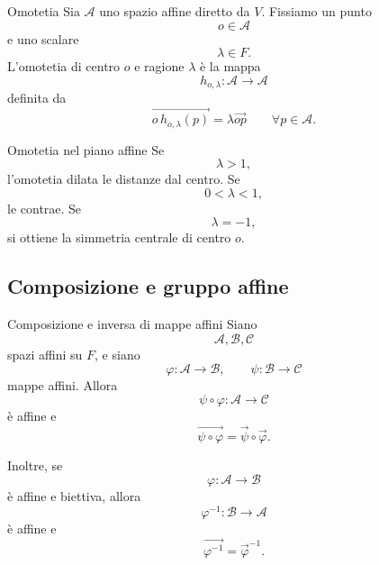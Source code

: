 \documentclass[a4paper]{article}
\begin{document}
\begin{snippetdefinition}{Omotetia}
    Sia \(\mathcal{A}\) uno spazio affine diretto da \(V\). Fissiamo un punto
    \[
        o\in\mathcal{A}
    \]
    e uno scalare
    \[
        \lambda\in F.
    \]
    L'omotetia di centro \(o\) e ragione \(\lambda\) è la mappa
    \[
        h_{o,\lambda}:\mathcal{A}\to\mathcal{A}
    \]
    definita da
    \[
        \overrightarrow{o\,h_{o,\lambda}(p)}
        =
        \lambda\overrightarrow{op}
        \qquad
        \forall p\in\mathcal{A}.
    \]
\end{snippetdefinition}

\begin{snippetexample}{Omotetia nel piano affine}
    Se
    \[
        \lambda>1,
    \]
    l'omotetia dilata le distanze dal centro. Se
    \[
        0<\lambda<1,
    \]
    le contrae. Se
    \[
        \lambda=-1,
    \]
    si ottiene la simmetria centrale di centro \(o\).

    \begin{center}
    \end{center}
\end{snippetexample}

\subsection{Composizione e gruppo affine}

\begin{snippetproposition}{Composizione e inversa di mappe affini}
    Siano
    \[
        \mathcal{A},\mathcal{B},\mathcal{C}
    \]
    spazi affini su \(F\), e siano
    \[
        \varphi:\mathcal{A}\to\mathcal{B},
        \qquad
        \psi:\mathcal{B}\to\mathcal{C}
    \]
    mappe affini. Allora
    \[
        \psi\circ\varphi:\mathcal{A}\to\mathcal{C}
    \]
    è affine e
    \[
        \overrightarrow{\psi\circ\varphi}
        =
        \overrightarrow{\psi}\circ\overrightarrow{\varphi}.
    \]

    Inoltre, se
    \[
        \varphi:\mathcal{A}\to\mathcal{B}
    \]
    è affine e biettiva, allora
    \[
        \varphi^{-1}:\mathcal{B}\to\mathcal{A}
    \]
    è affine e
    \[
        \overrightarrow{\varphi^{-1}}
        =
        \overrightarrow{\varphi}^{-1}.
    \]
\end{snippetproposition}
\end{document}
